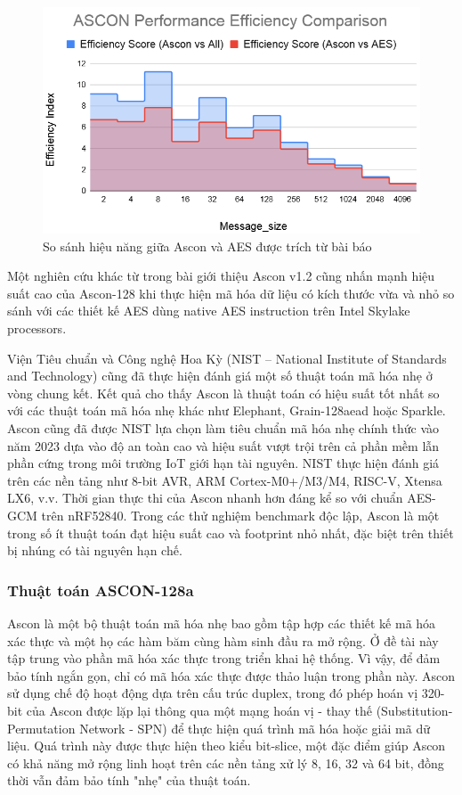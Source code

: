 \begin{figure}[h]
    \centering
    \includegraphics[width=0.7\linewidth]{ascon-aes.png}
    \caption{So sánh hiệu năng giữa Ascon và AES được trích từ bài báo}
    \label{fig:ascon-aes}
\end{figure}

Một nghiên cứu khác từ \cite{asconv1.2} trong bài giới thiệu Ascon v1.2 cũng nhấn mạnh hiệu suất cao của Ascon-128 khi thực hiện mã hóa dữ liệu có kích thước vừa và nhỏ so sánh với các thiết kế AES dùng native AES instruction trên Intel Skylake processors. 

Viện Tiêu chuẩn và Công nghệ Hoa Kỳ (NIST -- National Institute of Standards and Technology) cũng đã thực hiện đánh giá một số thuật toán mã hóa nhẹ ở vòng chung kết. Kết quả cho thấy Ascon là thuật toán có hiệu suất tốt nhất so với các thuật toán mã hóa nhẹ khác như Elephant, Grain-128aead hoặc Sparkle. Ascon cũng đã được NIST lựa chọn làm tiêu chuẩn mã hóa nhẹ chính thức vào năm 2023 dựa vào độ an toàn cao và hiệu suất vượt trội trên cả phần mềm lẫn phần cứng trong môi trường IoT giới hạn tài nguyên. NIST thực hiện đánh giá trên các nền tảng như 8-bit AVR, ARM Cortex-M0+/M3/M4, RISC-V, Xtensa LX6, v.v. Thời gian thực thi của Ascon nhanh hơn đáng kể so với chuẩn AES-GCM trên nRF52840. Trong các thử nghiệm benchmark độc lập, Ascon là một trong số ít thuật toán đạt hiệu suất cao và footprint nhỏ nhất, đặc biệt trên thiết bị nhúng có tài nguyên hạn chế.

\subsubsection{Thuật toán ASCON-128a}
Ascon là một bộ thuật toán mã hóa nhẹ bao gồm tập hợp các thiết kế mã hóa xác thực và một họ các hàm băm cùng hàm sinh đầu ra mở rộng. Ở đề tài này tập trung vào phần mã hóa xác thực trong triển khai hệ thống. Vì vậy, để đảm bảo tính ngắn gọn, chỉ có mã hóa xác thực được thảo luận trong phần này. Ascon sử dụng chế độ hoạt động dựa trên cấu trúc duplex, trong đó phép hoán vị 320-bit của Ascon được lặp lại thông qua một mạng hoán vị - thay thế (Substitution-Permutation Network - SPN) để thực hiện quá trình mã hóa hoặc giải mã dữ liệu. Quá trình này được thực hiện theo kiểu bit-slice, một đặc điểm giúp Ascon có khả năng mở rộng linh hoạt trên các nền tảng xử lý 8, 16, 32 và 64 bit, đồng thời vẫn đảm bảo tính "nhẹ" của thuật toán.

